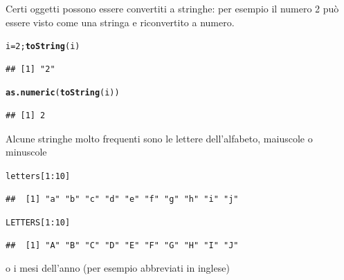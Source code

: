 \documentclass[onecolumn,12pt]{book}\usepackage[]{graphicx}\usepackage[]{color}
\makeatletter
\newcommand{\hlnum}[1]{\textcolor[rgb]{0.686,0.059,0.569}{#1}}%
\newcommand{\hlopt}[1]{\textcolor[rgb]{0,0,0}{#1}}%
\newcommand{\hlstd}[1]{\textcolor[rgb]{0.345,0.345,0.345}{#1}}%
\newcommand{\hlkwb}[1]{\textcolor[rgb]{0.69,0.353,0.396}{#1}}%
\newcommand{\hlkwd}[1]{\textcolor[rgb]{0.737,0.353,0.396}{\textbf{#1}}}%
\newenvironment{kframe}{%
 \def\at@end@of@kframe{}%
 \ifinner\ifhmode%
  \def\at@end@of@kframe{\end{minipage}}%
  \begin{minipage}{\columnwidth}%
 \fi\fi%
 \def\FrameCommand##1{\hskip\@totalleftmargin \hskip-\fboxsep
 \colorbox{shadecolor}{##1}\hskip-\fboxsep
     \hskip-\linewidth \hskip-\@totalleftmargin \hskip\columnwidth}%
 \MakeFramed {\advance\hsize-\width
   \@totalleftmargin\z@ \linewidth\hsize
   \@setminipage}}%
 {\par\unskip\endMakeFramed%
 \at@end@of@kframe}
\newenvironment{knitrout}{}{} %
\makeatother
\begin{document}
Certi oggetti possono essere convertiti a stringhe: per esempio il numero 2 pu\`o essere visto come una stringa e riconvertito a numero.
\begin{knitrout}
\color{fgcolor}\begin{kframe}
\begin{alltt}
\hlstd{i}\hlkwb{=}\hlnum{2}\hlstd{;}\hlkwd{toString}\hlstd{(i)}
\end{alltt}
\begin{verbatim}
## [1] "2"
\end{verbatim}
\begin{alltt}
\hlkwd{as.numeric}\hlstd{(}\hlkwd{toString}\hlstd{(i))}
\end{alltt}
\begin{verbatim}
## [1] 2
\end{verbatim}
\end{kframe}
\end{knitrout}
Alcune stringhe molto frequenti sono le lettere  dell'alfabeto, maiuscole o minuscole
\begin{knitrout}
\color{fgcolor}\begin{kframe}
\begin{alltt}
\hlstd{letters[}\hlnum{1}\hlopt{:}\hlnum{10}\hlstd{]}
\end{alltt}
\begin{verbatim}
##  [1] "a" "b" "c" "d" "e" "f" "g" "h" "i" "j"
\end{verbatim}
\begin{alltt}
\hlstd{LETTERS[}\hlnum{1}\hlopt{:}\hlnum{10}\hlstd{]}
\end{alltt}
\begin{verbatim}
##  [1] "A" "B" "C" "D" "E" "F" "G" "H" "I" "J"
\end{verbatim}
\end{kframe}
\end{knitrout}
o i mesi dell'anno (per esempio abbreviati in inglese)
\end{document}
